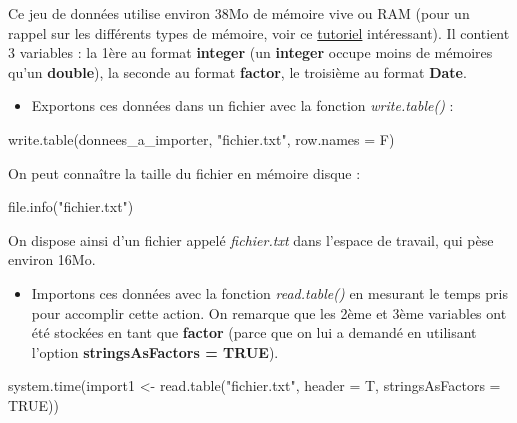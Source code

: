 \documentclass[
]{book}
\newenvironment{Shaded}{\begin{snugshade}}{\end{snugshade}}
\newcommand{\AttributeTok}[1]{\textcolor[rgb]{0.77,0.63,0.00}{#1}}
\newcommand{\ConstantTok}[1]{\textcolor[rgb]{0.00,0.00,0.00}{#1}}
\newcommand{\FunctionTok}[1]{\textcolor[rgb]{0.00,0.00,0.00}{#1}}
\newcommand{\NormalTok}[1]{#1}
\newcommand{\OtherTok}[1]{\textcolor[rgb]{0.56,0.35,0.01}{#1}}
\newcommand{\StringTok}[1]{\textcolor[rgb]{0.31,0.60,0.02}{#1}}
\providecommand{\tightlist}{%
  \setlength{\itemsep}{0pt}\setlength{\parskip}{0pt}}
\theoremstyle{definition}
\theoremstyle{definition}
\theoremstyle{definition}
\theoremstyle{definition}
\theoremstyle{remark}
\begin{document}
Ce jeu de données utilise environ 38Mo de mémoire vive ou RAM (pour un rappel sur les différents types de mémoire, voir ce \href{https://cours-informatique-gratuit.fr/cours/disque-dur-et-ram/}{tutoriel} intéressant). Il contient 3 variables : la 1ère au format \textbf{integer} (un \textbf{integer} occupe moins de mémoires qu'un \textbf{double}), la seconde au format \textbf{factor}, le troisième au format \textbf{Date}.

\begin{itemize}
\tightlist
\item
  Exportons ces données dans un fichier avec la fonction \emph{write.table()} :
\end{itemize}

\begin{Shaded}
\begin{Highlighting}[]
\FunctionTok{write.table}\NormalTok{(donnees\_a\_importer, }\StringTok{"fichier.txt"}\NormalTok{, }\AttributeTok{row.names =}\NormalTok{ F)}
\end{Highlighting}
\end{Shaded}

On peut connaître la taille du fichier en mémoire disque :

\begin{Shaded}
\begin{Highlighting}[]
\FunctionTok{file.info}\NormalTok{(}\StringTok{"fichier.txt"}\NormalTok{)}
\end{Highlighting}
\end{Shaded}

On dispose ainsi d'un fichier appelé \emph{fichier.txt} dans l'espace de travail, qui pèse environ 16Mo.

\begin{itemize}
\tightlist
\item
  Importons ces données avec la fonction \emph{read.table()} en mesurant le temps pris pour accomplir cette action. On remarque que les 2ème et 3ème variables ont été stockées en tant que \textbf{factor} (parce que on lui a demandé en utilisant l'option \textbf{stringsAsFactors = TRUE}).
\end{itemize}

\begin{Shaded}
\begin{Highlighting}[]
\FunctionTok{system.time}\NormalTok{(import1 }\OtherTok{\textless{}{-}} \FunctionTok{read.table}\NormalTok{(}\StringTok{"fichier.txt"}\NormalTok{, }\AttributeTok{header =}\NormalTok{ T, }
                                  \AttributeTok{stringsAsFactors =} \ConstantTok{TRUE}\NormalTok{))}
\end{Highlighting}
\end{Shaded}
\end{document}
